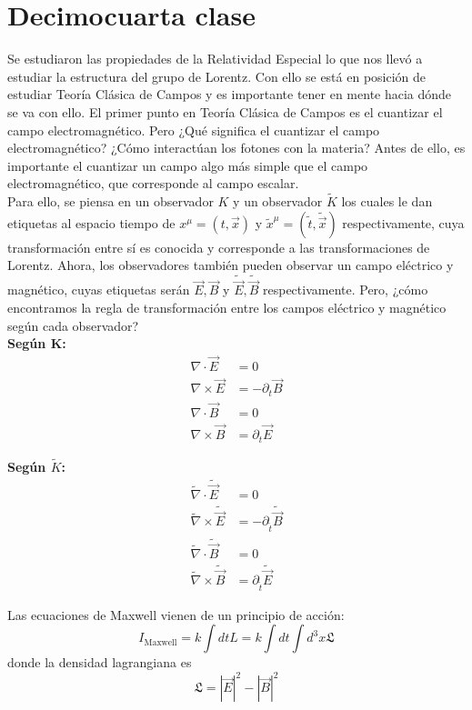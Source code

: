 \documentclass[../main.tex]{subfiles}
\begin{document}
\section{Decimocuarta clase}

Se estudiaron las propiedades de la Relatividad Especial lo que nos llevó a estudiar la estructura del grupo de Lorentz. Con ello se está en posición de estudiar Teoría Clásica de Campos y es importante tener en mente hacia dónde se va con ello. El primer punto en Teoría Clásica de Campos es el cuantizar el campo electromagnético. Pero ¿Qué significa el cuantizar el campo electromagnético? ¿Cómo interactúan los fotones con la materia? Antes de ello, es importante el cuantizar un campo algo más simple que el campo electromagnético, que corresponde al campo escalar. \\

Para ello, se piensa en un observador $K$ y un observador $\tilde{K}$ los cuales le dan etiquetas al espacio tiempo de $x^\mu=(t,\vec{x})$ y $\tilde{x}^\mu = (\tilde{t},\tilde{\vec{x}})$ respectivamente, cuya transformación entre sí es conocida y corresponde a las transformaciones de Lorentz. Ahora, los observadores también pueden observar un campo eléctrico y magnético, cuyas etiquetas serán $\vec{E},\vec{B}$ y $\tilde{\vec{E}},\tilde{\vec{B}}$ respectivamente. Pero, ¿cómo encontramos la regla de transformación entre los campos eléctrico y magnético según cada observador? \\

\textbf{Según K:}
\begin{align*}
  \nabla \cdot \vec{E} & = 0 \\
  \nabla \times \vec{E} & = -\partial_t \vec{B} \\
  \nabla \cdot \vec{B} & = 0 \\
  \nabla \times \vec{B} & = \partial_t \vec{E}
\end{align*}

\textbf{Según $\tilde{K}$:}
\begin{align*}
  \tilde{\nabla}\cdot \tilde{\vec{E}} & = 0 \\
  \tilde{\nabla} \times \tilde{\vec{E}} & = -\partial_{\tilde{t}}\tilde{\vec{B}} \\
  \tilde{\nabla} \cdot \tilde{\vec{B}} & = 0 \\
  \tilde{\nabla} \times \tilde{\vec{B}} & = \partial_{\tilde{t}}\tilde{\vec{E}}  %
\end{align*}

Las ecuaciones de Maxwell vienen de un principio de acción:
\begin{equation}
  I_{\text{Maxwell}} = k\int dt L = k \int dt \int d^3 x  \mathfrak{L} 
\end{equation}
donde la densidad lagrangiana es
\begin{equation}
  \mathfrak{L} = |\vec{E}|^2 - |\vec{B}|^2  %
\end{equation}
\end{document}
